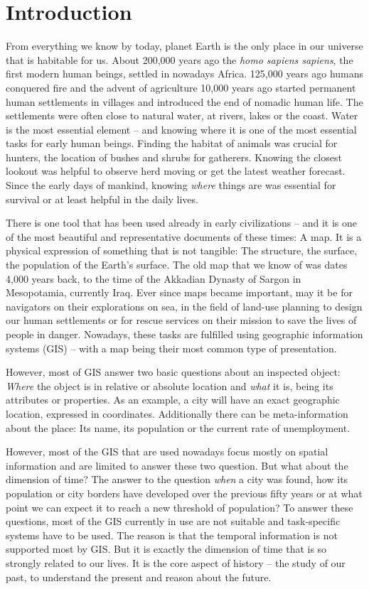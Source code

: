 
\chapter{Introduction}
\label{cha:introduction}
From everything we know by today, planet Earth is the only place in our universe that is habitable for us. About 200,000 years ago the \emph{homo sapiens sapiens}, the first modern human beings, settled in nowadays Africa. 125,000 years ago humans conquered fire and the advent of agriculture 10,000 years ago started permanent human settlements in villages and introduced the end of nomadic human life. The settlements were often close to natural water, at rivers, lakes or the coast. Water is the most essential element -- and knowing where it is one of the most essential tasks for early human beings. Finding the habitat of animals was crucial for hunters, the location of bushes and shrubs for gatherers. Knowing the closest lookout was helpful to observe herd moving or get the latest weather forecast. Since the early days of mankind, knowing \emph{where} things are was essential for survival or at least helpful in the daily lives.

There is one tool that has been used already in early civilizations -- and it is one of the most beautiful and representative documents of these times: A map. It is a physical expression of something that is not tangible: The structure, the surface, the population of the Earth's surface. The old map that we know of was dates 4,000 years back, to the time of the Akkadian Dynasty of Sargon in Mesopotamia, currently Iraq. Ever since maps became important, may it be for navigators on their explorations on sea, in the field of land-use planning to design our human settlements or for rescue services on their mission to save the lives of people in danger. Nowadays, these tasks are fulfilled using geographic information systems (GIS) -- with a map being their most common type of presentation.

However, most of GIS answer two basic questions about an inspected object: \emph{Where} the object is in relative or absolute location and \emph{what} it is, being its attributes or properties. As an example, a city will have an exact geographic location, expressed in coordinates. Additionally there can be meta-information about the place: Its name, its population or the current rate of unemployment.

However, most of the GIS that are used nowadays focus mostly on spatial information and are limited to answer these two question. But what about the dimension of time? The answer to the question \emph{when} a city was found, how its population or city borders have developed over the previous fifty years or at what point we can expect it to reach a new threshold of population? To answer these questions, most of the GIS currently in use are not suitable and task-specific systems have to be used. The reason is that the temporal information is not supported most by GIS. But it is exactly the dimension of time that is so strongly related to our lives. It is the core aspect of history -- the study of our past, to understand the present and reason about the future.

